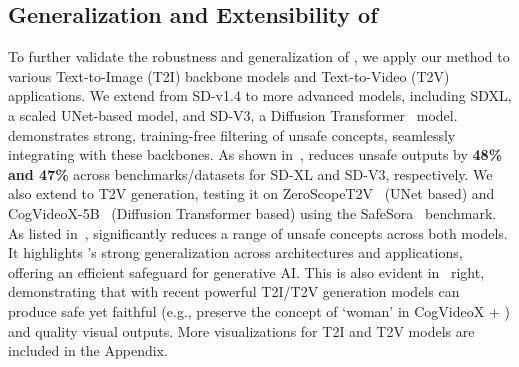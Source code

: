 \subsection{Generalization and Extensibility of \ours{}}\label{sec:t2v}


To further validate the robustness and generalization of \ours{}, we apply our method to various Text-to-Image (T2I) backbone models and Text-to-Video (T2V) applications. 
We extend \ours{} from SD-v1.4 to more advanced models, including SDXL, a scaled UNet-based model, and SD-V3, a Diffusion Transformer~\citep{peebles2023scalable} model. 
\ours{} demonstrates strong, training-free filtering of unsafe concepts, seamlessly integrating with these backbones. As shown in~, \ours{} reduces unsafe outputs by \textbf{48\% and 47\%} across benchmarks/datasets for SD-XL and SD-V3, respectively.
We also extend \ours{} to T2V generation, testing it on ZeroScopeT2V~\citep{2023zeroscope} (UNet based) and CogVideoX-5B~\citep{yang2024cogvideox} (Diffusion Transformer based) using the SafeSora~\citep{dai2024safesora} benchmark. 
As listed in~, \ours{} significantly reduces a range of unsafe concepts across both models. 
It highlights \ours{}'s strong generalization across architectures and applications, offering an efficient safeguard for generative AI. This is also evident in~ right, demonstrating that \ours{} with recent powerful T2I/T2V generation models can produce safe yet faithful (e.g., preserve the concept of `woman' in CogVideoX + \ours{}) and quality visual outputs. More visualizations for T2I and T2V models are included in the Appendix.



